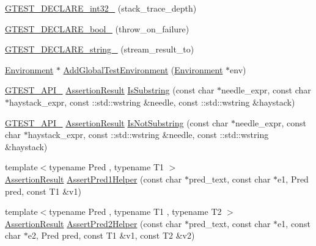 \begin{DoxyCompactItemize}
\item 
\hyperlink{namespacetesting_a718dcc037ef803268c49c7db88f776f8}{\-G\-T\-E\-S\-T\-\_\-\-D\-E\-C\-L\-A\-R\-E\-\_\-int32\-\_\-} (stack\-\_\-trace\-\_\-depth)
\item 
\hyperlink{namespacetesting_a2174553b8afb7450fbebf56c4cf64439}{\-G\-T\-E\-S\-T\-\_\-\-D\-E\-C\-L\-A\-R\-E\-\_\-bool\-\_\-} (throw\-\_\-on\-\_\-failure)
\item 
\hyperlink{namespacetesting_a88a6f5699cc1ed3b8b24db866dff7d20}{\-G\-T\-E\-S\-T\-\_\-\-D\-E\-C\-L\-A\-R\-E\-\_\-string\-\_\-} (stream\-\_\-result\-\_\-to)
\item 
\hyperlink{classtesting_1_1Environment}{\-Environment} $\ast$ \hyperlink{namespacetesting_a3541c13f74a9bfe0a35afe49ec9d76b9}{\-Add\-Global\-Test\-Environment} (\hyperlink{classtesting_1_1Environment}{\-Environment} $\ast$env)
\item 
\hyperlink{gtest-port_8h_aa73be6f0ba4a7456180a94904ce17790}{\-G\-T\-E\-S\-T\-\_\-\-A\-P\-I\-\_\-} \hyperlink{classtesting_1_1AssertionResult}{\-Assertion\-Result} \hyperlink{namespacetesting_a2ff5c4d0c112d92b20232bd0cf173904}{\-Is\-Substring} (const char $\ast$needle\-\_\-expr, const char $\ast$haystack\-\_\-expr, const \-::std\-::wstring \&needle, const \-::std\-::wstring \&haystack)
\item 
\hyperlink{gtest-port_8h_aa73be6f0ba4a7456180a94904ce17790}{\-G\-T\-E\-S\-T\-\_\-\-A\-P\-I\-\_\-} \hyperlink{classtesting_1_1AssertionResult}{\-Assertion\-Result} \hyperlink{namespacetesting_a2205435db77abd191fb8209bba41862a}{\-Is\-Not\-Substring} (const char $\ast$needle\-\_\-expr, const char $\ast$haystack\-\_\-expr, const \-::std\-::wstring \&needle, const \-::std\-::wstring \&haystack)
\item 
{\footnotesize template$<$typename Pred , typename T1 $>$ }\\\hyperlink{classtesting_1_1AssertionResult}{\-Assertion\-Result} \hyperlink{namespacetesting_a7f73180474723be6e92185d6fa9e7c9f}{\-Assert\-Pred1\-Helper} (const char $\ast$pred\-\_\-text, const char $\ast$e1, \-Pred pred, const \-T1 \&v1)
\item 
{\footnotesize template$<$typename Pred , typename T1 , typename T2 $>$ }\\\hyperlink{classtesting_1_1AssertionResult}{\-Assertion\-Result} \hyperlink{namespacetesting_aa6587938029dd8733ecb885068f08247}{\-Assert\-Pred2\-Helper} (const char $\ast$pred\-\_\-text, const char $\ast$e1, const char $\ast$e2, \-Pred pred, const \-T1 \&v1, const \-T2 \&v2)
\item 

\end{DoxyCompactItemize}
